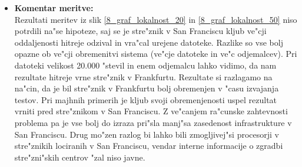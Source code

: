 \begin{itemize}
    \newpage
	\item \textbf{Komentar meritve: } \\
		Rezultati meritev iz slik \ref{8_graf_lokalnost_20} in \ref{8_graf_lokalnost_50} niso potrdili na"se hipoteze, saj se je stre"znik v San Franciscu kljub ve"cji oddaljenosti hitreje odzival in vra"cal urejene datoteke.
		Razlike so vse bolj opazne ob ve"cji obremenitvi sistema (ve"cje datoteke in ve"c odjemalcev). Pri datoteki velikost 20.000 "stevil in enem odjemalcu lahko vidimo, da nam rezultate hitreje vrne stre"znik v Frankfurtu. Rezultate si razlagamo na na"cin, da je bil stre"znik v Frankfurtu bolj obremenjen v "casu izvajanja testov. Pri majhnih primerih je kljub svoji obremenjenosti uspel rezultat vrniti pred stre"znikom v San Franciscu. Z ve"canjem ra"cunske zahtevnosti problema pa je vse bolj do izraza pri"sla manj"sa zasedenost infrastrukture v San Franciscu. Drug mo"zen razlog bi lahko bili zmogljivej"si procesorji v stre"znikih lociranih v San Franciscu, vendar interne informacije o zgradbi stre"zni"skih centrov "zal niso javne.
\end{itemize}

\newpage

